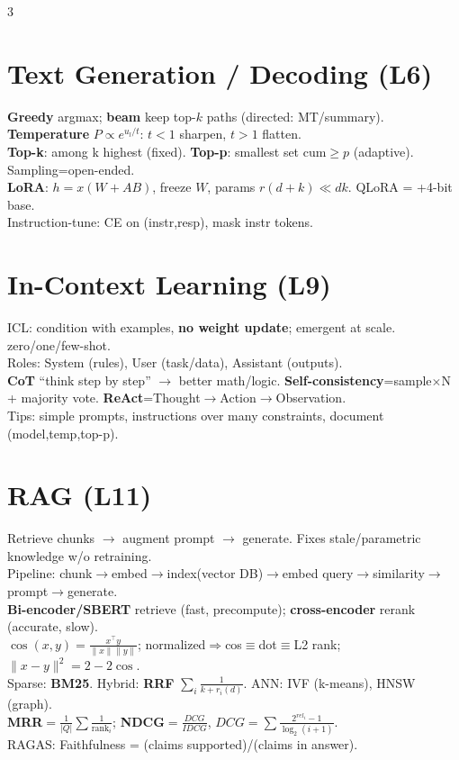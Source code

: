 \documentclass[12pt]{extarticle} %
\newcommand{\sub}[1]{\textcolor{key}{\textbf{#1}}}
\begin{document}
\begin{multicols}{3}
\section{Text Generation / Decoding \textnormal{(L6)}}
\sub{Greedy} argmax; \sub{beam} keep top-$k$ paths (directed: MT/summary).\\
\sub{Temperature} $P\propto e^{u_l/t}$: $t{<}1$ sharpen, $t{>}1$ flatten.\\
\sub{Top-k}: among k highest (fixed). \sub{Top-p}: smallest set cum$\ge p$ (adaptive). Sampling=open-ended.\\
\sub{LoRA}: $h{=}x(W{+}AB)$, freeze $W$, params $r(d{+}k)\!\ll\!dk$. QLoRA = +4-bit base.\\
Instruction-tune: CE on (instr,resp), mask instr tokens.

\section{In-Context Learning \textnormal{(L9)}}
ICL: condition with examples, \sub{no weight update}; emergent at scale. zero/one/few-shot.\\
Roles: System (rules), User (task/data), Assistant (outputs).\\
\sub{CoT} ``think step by step'' $\to$ better math/logic. \sub{Self-consistency}=sample$\times$N + majority vote. \sub{ReAct}=Thought$\to$Action$\to$Observation.\\
Tips: simple prompts, instructions over many constraints, document (model,temp,top-p).

\section{RAG \textnormal{(L11)}}
Retrieve chunks $\to$ augment prompt $\to$ generate. Fixes stale/parametric knowledge w/o retraining.\\
Pipeline: chunk$\to$embed$\to$index(vector DB)$\to$embed query$\to$similarity$\to$prompt$\to$generate.\\
\sub{Bi-encoder/SBERT} retrieve (fast, precompute); \sub{cross-encoder} rerank (accurate, slow).\\
$\cos(x,y){=}\tfrac{x^\top y}{\|x\|\|y\|}$; normalized$\Rightarrow$cos$\equiv$dot$\equiv$L2 rank; $\|x{-}y\|^2{=}2{-}2\cos$.\\
Sparse: \sub{BM25}. Hybrid: \sub{RRF} $\sum_i\tfrac1{k+r_i(d)}$. ANN: IVF (k-means), HNSW (graph).\\
\sub{MRR}$=\tfrac1{|Q|}\sum\tfrac1{\text{rank}_i}$; \sub{NDCG}$=\tfrac{DCG}{IDCG}$, $DCG{=}\sum\tfrac{2^{rel_i}-1}{\log_2(i{+}1)}$.\\
RAGAS: Faithfulness = (claims supported)/(claims in answer).


\end{multicols}
\end{document}
